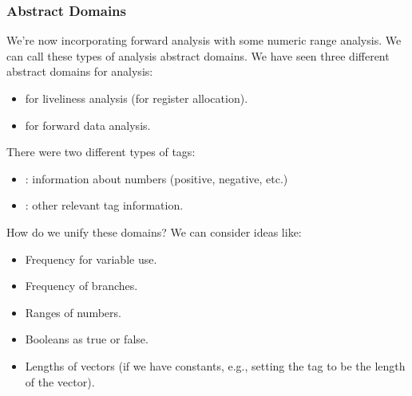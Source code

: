 \subsubsection{Abstract Domains}
We're now incorporating forward analysis with some numeric range analysis. We can call these types of analysis abstract domains. We have seen three different abstract domains for analysis: 
\begin{itemize}
    \item {} for liveliness analysis (for register allocation).
    \item {} for forward data analysis. 
\end{itemize}
There were two different types of tags: 
\begin{itemize}
    \item {}: information about numbers (positive, negative, etc.)
    \item {}: other relevant tag information.
\end{itemize}
How do we unify these domains? We can consider ideas like: 
\begin{itemize}
    \item Frequency for variable use.
    \item Frequency of branches. 
    \item Ranges of numbers. 
    \item Booleans as true or false.
    \item Lengths of vectors (if we have constants, e.g., setting the tag to be the length of the vector).
\end{itemize}

\restoregeometry
\newpage 